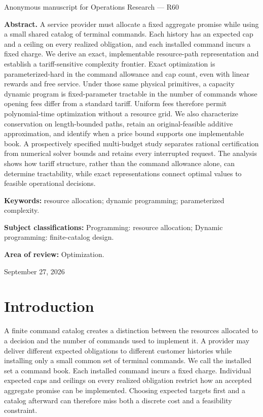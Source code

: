 \documentclass[11pt,letterpaper]{article}
\theoremstyle{definition}\newtheorem{remark}[theorem]{Remark}
\begin{document}
\hypersetup{pageanchor=false}
\begin{titlepage}
\vspace{0.25in}Anonymous manuscript for Operations Research --- R60\par\vspace{0.2in}
\begin{minipage}{\textwidth}\textbf{Abstract.} A service provider must allocate a fixed aggregate promise while using a small shared catalog of terminal commands. Each history has an expected cap and a ceiling on every realized obligation, and each installed command incurs a fixed charge. We derive an exact, implementable resource-path representation and establish a tariff-sensitive complexity frontier. Exact optimization is parameterized-hard in the command allowance and cap count, even with linear rewards and free service. Under those same physical primitives, a capacity dynamic program is fixed-parameter tractable in the number of commands whose opening fees differ from a standard tariff. Uniform fees therefore permit polynomial-time optimization without a resource grid. We also characterize conservation on length-bounded paths, retain an original-feasible additive approximation, and identify when a price bound supports one implementable book. A prospectively specified multi-budget study separates rational certification from numerical solver bounds and retains every interrupted request. The analysis shows how tariff structure, rather than the command allowance alone, can determine tractability, while exact representations connect optimal values to feasible operational decisions.
\par\vspace{0.15in}\textbf{Keywords:} resource allocation; dynamic programming; parameterized complexity.
\par\vspace{0.1in}\textbf{Subject classifications:} Programming: resource allocation; Dynamic programming: finite-catalog design.
\par\vspace{0.1in}\textbf{Area of review:} Optimization.\end{minipage}\vfill September 27, 2026\end{titlepage}
\hypersetup{pageanchor=true}
\section{Introduction}
A finite command catalog creates a distinction between the resources allocated to a decision and the number of commands used to implement it. A provider may deliver different expected obligations to different customer histories while installing only a small common set of terminal commands. We call the installed set a command book. Each installed command incurs a fixed charge. Individual expected caps and ceilings on every realized obligation restrict how an accepted aggregate promise can be implemented. Choosing expected targets first and a catalog afterward can therefore miss both a discrete cost and a feasibility constraint.
\end{document}
